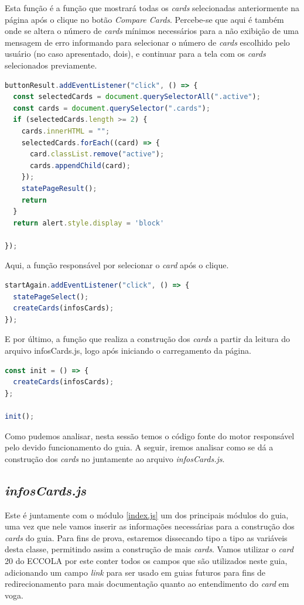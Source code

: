 Esta função é a função que mostrará todas os \textit{cards} selecionadas anteriormente na página após o clique no botão \textit{Compare Cards}. Percebe-se que aqui é também onde se altera o número de \textit{cards} mínimos necessários para a não exibição de uma mensagem de erro informando para selecionar o número de \textit{cards} escolhido pelo usuário (no caso apresentado, dois), e continuar para a tela com os \textit{cards} selecionados previamente.
\begin{lstlisting}[language=JavaScript, caption=Função que captura todos cards que estão ativos e transforma em um array.]
buttonResult.addEventListener("click", () => {
  const selectedCards = document.querySelectorAll(".active");
  const cards = document.querySelector(".cards");
  if (selectedCards.length >= 2) {
    cards.innerHTML = "";
    selectedCards.forEach((card) => {
      card.classList.remove("active");
      cards.appendChild(card);
    });
    statePageResult();
    return
  } 
  return alert.style.display = 'block'

});
\end{lstlisting}

Aqui, a função responsável por selecionar o \textit{card} após o clique.
\begin{lstlisting}[language=JavaScript, caption=Função para seleção de \textit{card} após clique.]
startAgain.addEventListener("click", () => {
  statePageSelect();
  createCards(infosCards);
});
\end{lstlisting}

E por último, a função que realiza a construção dos \textit{cards} a partir da leitura do arquivo infosCards.js, logo após iniciando o carregamento da página.
\begin{lstlisting}[language=JavaScript, caption=Construindo os \textit{cards}.]
const init = () => {
  createCards(infosCards);
};

init();
\end{lstlisting}

Como pudemos analisar, nesta sessão temos o código fonte do motor responsável pelo devido funcionamento do guia. A seguir, iremos analisar como se dá a construção dos \textit{cards} no juntamente ao arquivo \textit{infosCards.js}.

\subsection{\textit{infosCards.js}}
\label{infosCards.js}
Este é juntamente com o módulo \ref{index.js} um dos principais módulos do guia, uma vez que nele vamos inserir as informações necessárias para a construção dos \textit{cards} do guia. Para fins de prova, estaremos dissecando tipo a tipo as variáveis desta classe, permitindo assim a construção de mais \textit{cards}. Vamos utilizar o \textit{card} 20 do ECCOLA por este conter todos os campos que são utilizados neste guia, adicionando um campo \textit{link} para ser usado em guias futuros para fins de redirecionamento para mais documentação quanto ao entendimento do \textit{card} em voga.

